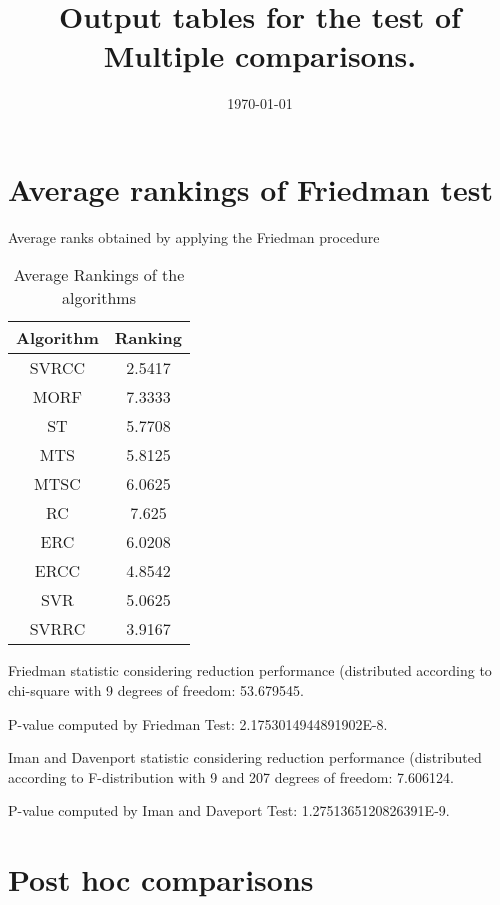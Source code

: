 \documentclass[a4paper,10pt]{article}
\title{Output tables for the test of Multiple comparisons.}
\author{}
\date{\today}
\begin{document}
\begin{landscape}
\pagestyle{empty}
\maketitle
\thispagestyle{empty}
\section{Average rankings of Friedman test}



Average ranks obtained by applying the Friedman procedure

\begin{table}[!htp]
\centering
\begin{tabular}{|c|c|}\hline
Algorithm&Ranking\\\hline
SVRCC & 2.5417\\
MORF & 7.3333\\
ST & 5.7708\\
MTS & 5.8125\\
MTSC & 6.0625\\
RC & 7.625\\
ERC & 6.0208\\
ERCC & 4.8542\\
SVR & 5.0625\\
SVRRC & 3.9167\\
\hline
\end{tabular}
\caption{Average Rankings of the algorithms}
\end{table}

Friedman statistic considering reduction performance (distributed according to chi-square with 9 degrees of freedom: 53.679545.

P-value computed by Friedman Test: 2.1753014944891902E-8.\newline

Iman and Davenport statistic considering reduction performance (distributed according to F-distribution with 9 and 207 degrees of freedom: 7.606124.

P-value computed by Iman and Daveport Test: 1.2751365120826391E-9.\newline



\pagebreak

\section{Post hoc comparisons}


\end{landscape}
\end{document}
